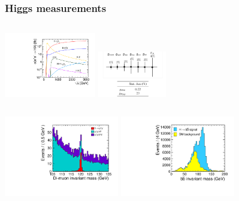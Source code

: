 \documentclass{beamer}
\begin{document}
\begin{frame}
\frametitle{Higgs measurements}
\centering
\begin{columns}[c]
\column{6cm}
\centering
\includegraphics[width=4cm]{xsec_vs_cme}
\column{6cm}
\includegraphics[width=3cm]{higgs}
\end{columns}
\begin{columns}[c]
\column{6cm}
\centering
\includegraphics[width=5cm]{ee_h_mumu_mass_mh120GeV}
\column{6cm}
\centering
\includegraphics[width=5cm]{ee_h_bb_mass_mh120GeV}
\end{columns}
\end{frame}
\end{document}
